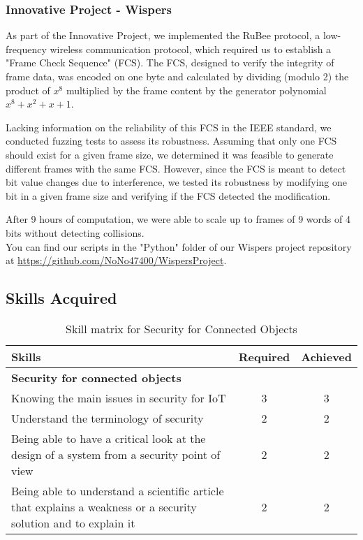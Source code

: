\subsubsection{Innovative Project - Wispers}
\indent \indent As part of the Innovative Project, we implemented the RuBee protocol, a low-frequency wireless communication protocol, which required us to establish a "Frame Check Sequence" (FCS). The FCS, designed to verify the integrity of frame data, was encoded on one byte and calculated by dividing (modulo 2) the product of \(x^8\) multiplied by the frame content by the generator polynomial \(x^8 + x^2 + x + 1\).
\vspace{0.25cm}

\noindent Lacking information on the reliability of this FCS in the IEEE standard, we conducted fuzzing tests to assess its robustness. Assuming that only one FCS should exist for a given frame size, we determined it was feasible to generate different frames with the same FCS.
However, since the FCS is meant to detect bit value changes due to interference, we tested its robustness by modifying one bit in a given frame size and verifying if the FCS detected the modification.
\vspace{0.25cm}

\noindent After 9 hours of computation, we were able to scale up to frames of 9 words of 4 bits without detecting collisions.\\ You can find our scripts in the "Python" folder of our Wispers project repository at \url{https://github.com/NoNo47400/WispersProject}.\\

\subsection{Skills Acquired}
\begin{table}[H]
    \centering
    \renewcommand{\arraystretch}{1.5} %
    \begin{tabular}{|p{11cm}|c|c|}
    \hline
    \rowcolor[gray]{0.8}
    \textbf{Skills} & \textbf{Required} & \textbf{Achieved} \\ \hline
    \rowcolor[gray]{0.9} \textbf{Security for connected objects} &  &  \\ \hline
    Knowing the main issues in security for IoT & 3 & 3 \\ \hline
    Understand the terminology of security & 2 & 2 \\ \hline
    Being able to have a critical look at the design of a system from a security point of view & 2 & 2 \\ \hline
    Being able to understand a scientific article that explains a weakness or a security solution and to explain it & 2 & 2 \\ \hline
    \end{tabular}
    \caption{Skill matrix for Security for Connected Objects}
    \label{table:skills-security-iot}
\end{table}

